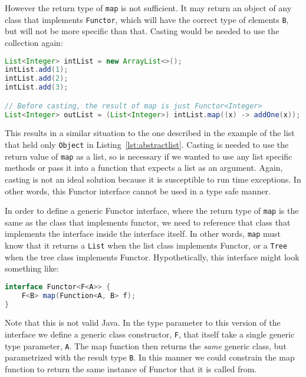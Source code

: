 However the return type of \lstinline{map} is not sufficient. It may return an
object of any class that implements \lstinline{Functor}, which will have the
correct type of elements \lstinline{B}, but will not be more specific than
that. Casting would be needed to use the collection again:

\begin{lstlisting}[nolol, language=Java, label={lst:map}]
List<Integer> intList = new ArrayList<>();
intList.add(1);
intList.add(2);
intList.add(3);

// Before casting, the result of map is just Functor<Integer>
List<Integer> outList = (List<Integer>) intList.map((x) -> addOne(x));
\end{lstlisting}

This results in a similar situation to the one described in the example of the
list that held only \lstinline{Object} in Listing~\ref{lst:abstractlist}.
Casting is needed to use the return value of \lstinline{map} as a list, so is
necessary if we wanted to use any list specific methods or pass it into a
function that expects a list as an argument. Again, casting is not an ideal
solution because it is susceptible to run time exceptions. In other words, this
Functor interface cannot be used in a type safe manner.

In order to define a generic Functor interface, where the return type of
\lstinline{map} is the same as the class that implements functor, we need to
reference that class that implements the interface inside the interface itself.
In other words, \lstinline{map} must know that it returns a \lstinline{List}
when the list class implements Functor, or a \lstinline{Tree} when the tree
class implements Functor. Hypothetically, this interface might look something
like:

\begin{lstlisting}[caption=Hypothetical type safe functor in Java, language=Java, label={lst:fakefunctor}]
interface Functor<F<A>> {
    F<B> map(Function<A, B> f);
}
\end{lstlisting}

Note that this is not valid Java. In the type parameter to this version of the
interface we define a generic class constructor, \lstinline{F}, that itself
take a single generic type parameter, \lstinline{A}. The map function then
returns the \textit{same} generic class, but parametrized with the result type
\lstinline{B}. In this manner we could constrain the map function to return the
same instance of Functor that it is called from.

